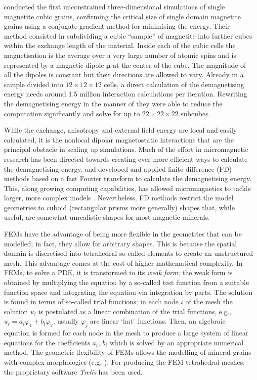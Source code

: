 \citet{Williams1989} conducted the first unconstrained three-dimensional simulations of single magnetite cubic grains, confirming the critical size of single domain magnetite grains using a conjugate gradient method for minimising the energy. Their method consisted in subdividing a cubic ``sample'' of magnetite into further cubes within the exchange length of the material. Inside each of the cubic cells the magnetisation is the average over a very large number of atomic spins and is represented by a magnetic dipole $\boldsymbol{\mu}$ at the center of the cube. The magnitude of all the dipoles is constant but their directions are allowed to vary. Already in a sample divided into $12\times 12\times 12$ cells, a direct calculation of the demagnetising energy needs around 1.5 million interaction calculations per iteration. Rewriting the demagnetising energy in the manner of \citet{Rhodes1954} they were able to reduce the computation significantly and solve for up to $22\times 22\times 22$ subcubes.\par

While the exchange, anisotropy and external field energy are local and easily calculated, it is the nonlocal dipolar magnetostatic interactions that are the principal obstacle in scaling up simulations. Much of the effort in micromagnetic research has been directed towards creating ever more efficient ways to calculate the demagnetising energy. \citet{Fabian1996} and \citet{Wright1997} developed and applied finite difference (FD) methods based on a fast Fourier transform to calculate the demagnetising energy. This, along growing computing capabilities, has allowed micromagnetics to tackle larger, more complex models \citep{Williams1998}. Nevertheless, FD methods restrict the model geometries to cuboid (rectangular prisms more generally) shapes that, while useful, are somewhat unrealistic shapes for most magnetic minerals.\par

FEMs have the advantage of being more flexible in the geometries that can be modelled; in fact, they allow for arbitrary shapes. This is because the spatial domain is discretised into tetrahedral so-called elements to create an unstructured mesh. This advantage comes at the cost of higher mathematical complexity. In FEMs, to solve a PDE, it is transformed to its \emph{weak form}; the weak form is obtained by multiplying the equation by a so-called test function from a suitable function space and integrating the equation via integration by parts. The solution is found in terms of so-called trial functions; in each node $i$ of the mesh the solution $u_i$ is postulated as a linear combination of the trial functions, e.g., $u_i=a_i\varphi_1 + b_i\varphi_2$, usually $\varphi_j$ are linear `hat' functions. Then, an algebraic equation is formed for each node in the mesh to produce a large system of linear equations for the coefficients $a_i,\,b_i$ which is solved by an appropriate numerical method. The geometric flexibility of FEMs allows the modelling of mineral grains with complex morphologies (e.g. \citet{Williams2010}). For producing the FEM tetrahedral meshes, the proprietary software \emph{Trelis} has been used.\par

